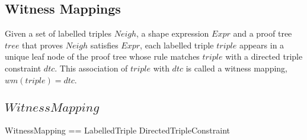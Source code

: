 \documentclass{article}
\begin{document}
\subsection{Witness Mappings}
Given a set of labelled triples $Neigh$, a shape expression $Expr$ and a proof tree $tree$ that proves $Neigh$ satisfies $Expr$, 
each labelled triple $triple$ appears in a unique leaf node of the proof tree whose rule matches $triple$ with a directed triple constraint $dtc$.
This association of $triple$ with $dtc$ is called a witness mapping, $wm(triple) = dtc$.

\subsection{$WitnessMapping$}
\begin{zed}
	WitnessMapping == LabelledTriple \pfun DirectedTripleConstraint
\end{zed}
\end{document}
